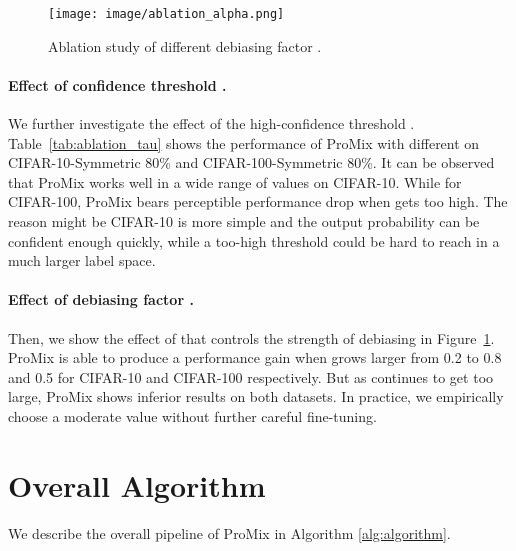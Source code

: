 \documentclass{article}
\begin{document}
\begin{figure}[!t]
     \centering
         \texttt{[image: image/ablation\_alpha.png]}
     \caption{ Ablation study of different debiasing factor  . }
     \label{fig:ablation_alpha}
\end{figure}





\paragraph{Effect of confidence threshold .}
We further investigate the effect of the high-confidence threshold . Table~\ref{tab:ablation_tau} shows the performance of ProMix with different  on CIFAR-10-Symmetric 80\% and CIFAR-100-Symmetric 80\%. It can be observed that ProMix works well in a wide range of  values on CIFAR-10. While for CIFAR-100, ProMix bears perceptible performance drop when  gets too high. The reason might be CIFAR-10 is more simple and the output probability can be confident enough quickly, while a too-high threshold could be hard to reach in a much larger label space.

\paragraph{Effect of debiasing factor .}
Then, we show the effect of  that controls the strength of debiasing in Figure~\ref{fig:ablation_alpha}. ProMix is able to produce a performance gain when  grows larger from 0.2 to 0.8 and 0.5 for CIFAR-10 and CIFAR-100 respectively. But as  continues to get too large, ProMix shows inferior results on both datasets. 
In practice, we empirically choose a moderate value without further careful fine-tuning.

\section{Overall Algorithm}
We describe the overall pipeline of ProMix in Algorithm \ref{alg:algorithm}. 
\end{document}
